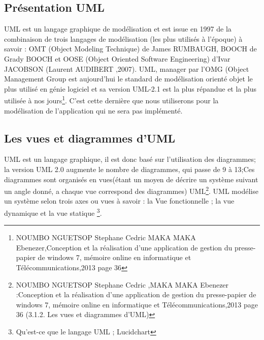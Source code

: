 \documentclass[a4paper, 12pt]{article}
\begin{document}
\subsection{Présentation UML}
\quad UML est un langage graphique de modélisation et est issue en 1997 de la combinaison de trois langages de modélisation (les plus utilisés à l’époque) à savoir : OMT (Object Modeling Technique) de James RUMBAUGH, BOOCH de Grady BOOCH et OOSE (Object Oriented Software Engineering) d’Ivar JACOBSON (Laurent AUDIBERT ,2007). UML, manager par l’OMG (Object Management Group est aujourd’hui le standard de modélisation orienté objet le plus utilisé en génie logiciel et sa version UML-2.1 est la plus répandue et la plus utilisée à nos jours\footnote{NOUMBO NGUETSOP Stephane Cedric MAKA MAKA Ebenezer,Conception et la réalisation d'une application de gestion du presse-papier de windows 7, mémoire  online en informatique et Télécommunications,2013 page 36}. C’est cette dernière que nous utiliserons pour la modélisation de l’application qui ne sera pas implémenté.


\subsection{Les vues et diagrammes d’UML}

\quad UML est un langage graphique, il est donc basé sur l’utilisation des diagrammes; la version UML 2.0 augmente le nombre de diagrammes, qui passe de 9 à 13;Ces diagrammes sont organisés en vues(étant un moyen de décrire un système suivant un angle donné, a chaque vue correspond des diagrammes) UML\footnote{NOUMBO NGUETSOP Stephane Cedric ,MAKA MAKA Ebenezer :Conception et la réalisation d'une application de gestion du presse-papier de windows 7, mémoire  online en informatique et Télécommunications,2013 page 36 (3.1.2. Les vues et diagrammes d'UML)}.
UML modélise un système selon trois axes ou vues à savoir : la Vue fonctionnelle ; la vue dynamique  et la vue statique \footnote{ Qu'est-ce que le langage UML ; Lucidchart}.
\end{document}
